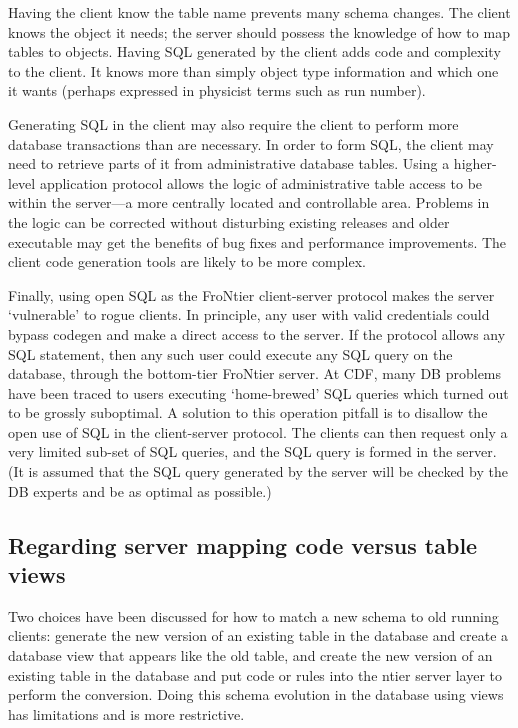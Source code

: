 Having the client know the table name
prevents many schema changes. The client knows the object it needs;
the server should possess the knowledge of how to map tables to
objects. Having SQL generated by the client adds code and complexity
to the client. It knows more than simply object type information and
which one it wants (perhaps expressed in physicist terms such as run
number).

Generating SQL in the client may also require the client to
perform more database transactions than are necessary. In order to
form SQL, the client may need to retrieve parts of it from
administrative database tables. Using a higher-level application
protocol allows the logic of administrative table access to be within
the server---a more centrally located and controllable area. Problems
in the logic can be corrected without disturbing existing releases and
older executable may get the benefits of bug fixes and performance
improvements. The client code generation tools are likely to be more
complex.

Finally, using open SQL as the FroNtier client-server protocol makes
the server `vulnerable' to rogue clients.  In principle, any user with
valid credentials could bypass codegen and make a direct access to the
server.  If the protocol allows any SQL statement, then any such user
could execute any SQL query on the database, through the bottom-tier
FroNtier server.  At CDF, many DB problems have been traced to users
executing `home-brewed' SQL queries which turned out to be grossly
suboptimal.  A solution to this operation pitfall is to disallow the
open use of SQL in the client-server protocol.  The clients can then
request only a very limited sub-set of SQL queries, and the SQL
query is formed in the server.  (It is assumed that the SQL query
generated by the server will be checked by the DB experts and
be as optimal as possible.) 


\subsection{Regarding server mapping code versus table views}

Two choices have been discussed for how to match a new schema to old
running clients: generate the new version of an existing table in the
database and create a database view that appears like the old table,
and create the new version of an existing table in the database and
put code or rules into the ntier server layer to perform the
conversion. Doing this schema evolution in the database using views
has limitations and is more restrictive. 

